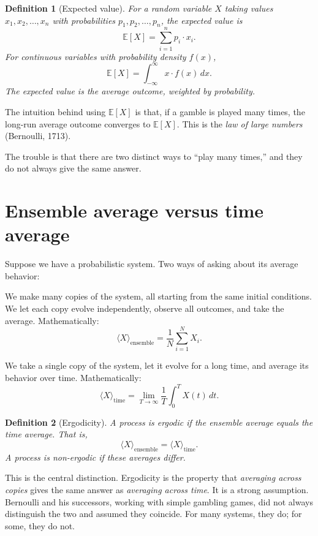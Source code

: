 \documentclass[11pt,a4paper]{book}
\theoremstyle{cleanrm}
\newtheorem{definition}{Definition}[chapter]
\begin{document}
\begin{definition}[Expected value]
For a random variable $X$ taking values $x_1, x_2, \dots, x_n$ with
probabilities $p_1, p_2, \dots, p_n$, the \emph{expected value} is
\[
    \mathbb{E}[X] = \sum_{i=1}^{n} p_i \cdot x_i.
\]
For continuous variables with probability density $f(x)$,
\[
    \mathbb{E}[X] = \int_{-\infty}^{\infty} x \cdot f(x)\, dx.
\]
The expected value is the average outcome, weighted by probability.
\end{definition}

The intuition behind using $\mathbb{E}[X]$ is that, if a gamble is
played many times, the long-run average outcome converges to
$\mathbb{E}[X]$. This is the \emph{law of large numbers} (Bernoulli,
1713).

The trouble is that there are two distinct ways to ``play many times,''
and they do not always give the same answer.

\section{Ensemble average versus time average}

Suppose we have a probabilistic system. Two ways of asking about its
average behavior:

\begin{description}[leftmargin=2em]
    \item[Ensemble average.] We make many copies of the system, all
    starting from the same initial conditions. We let each copy evolve
    independently, observe all outcomes, and take the average.
    Mathematically:
    \[
        \langle X \rangle_{\text{ensemble}} = \frac{1}{N} \sum_{i=1}^{N} X_i.
    \]
    \item[Time average.] We take a single copy of the system, let it
    evolve for a long time, and average its behavior over time.
    Mathematically:
    \[
        \langle X \rangle_{\text{time}} = \lim_{T \to \infty}
        \frac{1}{T} \int_0^T X(t)\, dt.
    \]
\end{description}

\begin{definition}[Ergodicity]
A process is \emph{ergodic} if the ensemble average equals the time
average. That is,
\[
    \langle X \rangle_{\text{ensemble}} = \langle X \rangle_{\text{time}}.
\]
A process is \emph{non-ergodic} if these averages differ.
\end{definition}

This is the central distinction. Ergodicity is the property that
\emph{averaging across copies} gives the same answer as
\emph{averaging across time}. It is a strong assumption. Bernoulli and
his successors, working with simple gambling games, did not always
distinguish the two and assumed they coincide. For many systems,
they do; for some, they do not.
\end{document}
